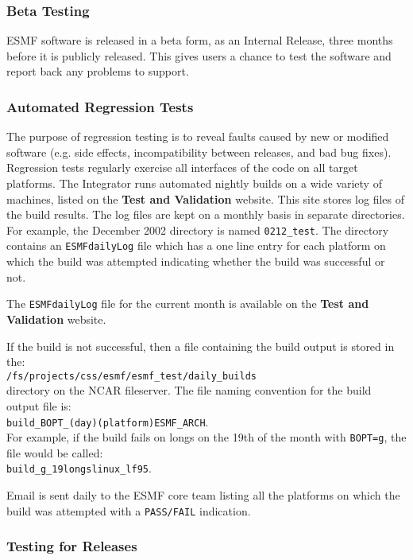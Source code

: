 \subsubsection{Beta Testing}

ESMF software is released in a beta form, as an Internal Release,
three months before it is publicly released.  This gives users
a chance to test the software and report back any problems to 
support.

\subsubsection{Automated Regression Tests}

The purpose of regression testing is to reveal faults caused by new
or modified software (e.g. side effects, incompatibility between 
releases, and bad bug fixes).  
Regression tests regularly exercise all interfaces of the code on 
all target platforms.  The Integrator runs 
automated nightly builds on a wide variety of machines, listed on the
{\bf Test and Validation} website. This site stores log files of the
build results.
The log files are kept on a monthly basis in 
separate directories. For example, the December 2002 directory is named {\tt 0212\_test}. The 
directory contains an {\tt ESMFdailyLog} file which has a one line entry for each platform on 
which the build was attempted indicating whether the build was successful or not. 

The {\tt ESMFdailyLog} file for the current month is available on the {\bf Test and Validation} website.

If the build is not successful, then a file containing the build output is stored in 
the:\\
{\tt /fs/projects/css/esmf/esmf\_test/daily\_builds}\\
directory on the NCAR fileserver. The file naming convention for the build output file is:\\
{\tt build\_BOPT\_(day)(platform)ESMF\_ARCH}.\\
For example, if the build fails on longs on the 19th of the month with {\tt BOPT=g},
the file would be called:\\
{\tt build\_g\_19longslinux\_lf95}. 

Email is sent daily to the ESMF core team listing all the platforms on which the build was attempted with a {\tt PASS/FAIL} indication. 

\subsubsection{Testing for Releases}

